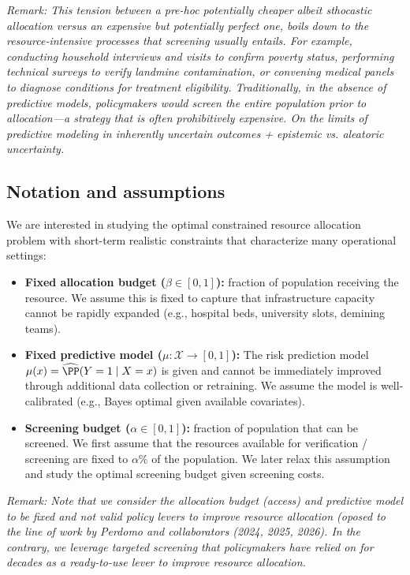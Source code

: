 \documentclass[11pt]{article}
\begin{document}
\textit{Remark: This tension between a pre-hoc potentially cheaper albeit sthocastic allocation versus an expensive but potentially perfect one, boils down to the resource-intensive processes that screening usually entails. For example, conducting household interviews and visits to confirm poverty status, performing technical surveys to verify landmine contamination, or convening medical panels to diagnose conditions for treatment eligibility. Traditionally, in the absence of predictive models, policymakers would screen the entire population prior to allocation—a strategy that is often prohibitively expensive. On the limits of predictive modeling in inherently uncertain outcomes + epistemic vs. aleatoric uncertainty.}

\subsection*{Notation and assumptions}

We are interested in studying the optimal constrained resource allocation problem with short-term realistic constraints that characterize many operational settings:
\begin{itemize}
    \item \textbf{Fixed allocation budget ($\beta \in [0,1]$):} fraction of population receiving the resource. We assume this is fixed to capture that infrastructure capacity cannot be rapidly expanded (e.g., hospital beds, university slots, demining teams).
    \item \textbf{Fixed predictive model ($\mu: \mathcal{X} \to [0,1]$):} The risk prediction model $\mu(x) = \widehat{\PP}(Y=1 \mid X=x)$ is given and cannot be immediately improved through additional data collection or retraining. We assume the model is well-calibrated (e.g., Bayes optimal given available covariates).
    \item \textbf{Screening budget ($\alpha \in [0,1]$):} fraction of population that can be screened. We first assume that the resources available for verification / screening are fixed to $\alpha\%$ of the population. We later relax this assumption and study the optimal screening budget given screening costs.    
\end{itemize}

\textit{Remark: Note that we consider the allocation budget (access) and predictive model to be fixed and not valid policy levers to improve resource allocation (oposed to the line of work by Perdomo and collaborators (2024, 2025, 2026). In the contrary, we leverage targeted screening that policymakers have relied on for decades as a ready-to-use lever to improve resource allocation.}
\end{document}

